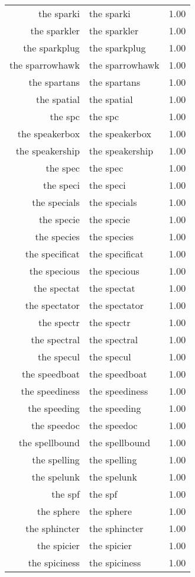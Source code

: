 \begin{table}[ht]
\begin{tabular}{rlr}
  the sparki & the sparki & 1.00 \\ 
  the sparkler & the sparkler & 1.00 \\ 
  the sparkplug & the sparkplug & 1.00 \\ 
  the sparrowhawk & the sparrowhawk & 1.00 \\ 
  the spartans & the spartans & 1.00 \\ 
  the spatial & the spatial & 1.00 \\ 
  the spc & the spc & 1.00 \\ 
  the speakerbox & the speakerbox & 1.00 \\ 
  the speakership & the speakership & 1.00 \\ 
  the spec & the spec & 1.00 \\ 
  the speci & the speci & 1.00 \\ 
  the specials & the specials & 1.00 \\ 
  the specie & the specie & 1.00 \\ 
  the species & the species & 1.00 \\ 
  the specificat & the specificat & 1.00 \\ 
  the specious & the specious & 1.00 \\ 
  the spectat & the spectat & 1.00 \\ 
  the spectator & the spectator & 1.00 \\ 
  the spectr & the spectr & 1.00 \\ 
  the spectral & the spectral & 1.00 \\ 
  the specul & the specul & 1.00 \\ 
  the speedboat & the speedboat & 1.00 \\ 
  the speediness & the speediness & 1.00 \\ 
  the speeding & the speeding & 1.00 \\ 
  the speedoc & the speedoc & 1.00 \\ 
  the spellbound & the spellbound & 1.00 \\ 
  the spelling & the spelling & 1.00 \\ 
  the spelunk & the spelunk & 1.00 \\ 
  the spf & the spf & 1.00 \\ 
  the sphere & the sphere & 1.00 \\ 
  the sphincter & the sphincter & 1.00 \\ 
  the spicier & the spicier & 1.00 \\ 
  the spiciness & the spiciness & 1.00 \\ 

\end{tabular}
\end{table}
